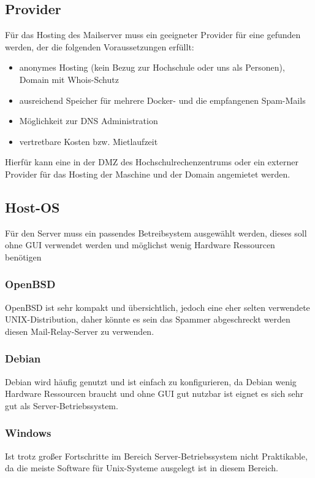 \documentclass[a4paper,11pt,singlespacing]{article}
\begin{document}
	\subsection{Provider}\label{sec:Provider}
		Für das Hosting des Mailserver  muss ein geeigneter Provider für eine  gefunden werden, der die folgenden Voraussetzungen erfüllt:
		\begin{itemize}
		    \item anonymes Hosting (kein Bezug zur Hochschule oder uns als Personen), Domain mit Whois-Schutz
			\item ausreichend Speicher für mehrere Docker- und die empfangenen Spam-Mails
			\item Möglichkeit zur DNS Administration
			\item vertretbare Kosten bzw. Mietlaufzeit
		\end{itemize}
		
		Hierfür kann eine  in der DMZ des Hochschulrechenzentrums oder ein externer Provider für das Hosting der Maschine und der Domain angemietet werden.

	\subsection{Host-OS}\label{sec:Host-Maschine}
		Für den Server muss ein passendes Betreibsystem ausgewählt werden, dieses soll ohne GUI verwendet werden und möglichst wenig Hardware Ressourcen benötigen
		\subsubsection{OpenBSD}\label{sec:OpenBSD}
			OpenBSD ist sehr kompakt und übersichtlich, jedoch eine eher selten verwendete UNIX-Distribution, daher könnte es sein das Spammer abgeschreckt werden diesen Mail-Relay-Server zu verwenden.
		\subsubsection{Debian}\label{sec:Debian}
			Debian wird häufig genutzt und ist einfach zu konfigurieren, da Debian wenig Hardware Ressourcen braucht und ohne GUI gut nutzbar ist eignet es sich sehr gut als Server-Betriebssystem.
		\subsubsection{Windows}\label{sec:Windows}
			Ist trotz großer Fortschritte im Bereich Server-Betriebssystem nicht Praktikable, da die meiste Software für Unix-Systeme ausgelegt ist in diesem Bereich.
\end{document}
